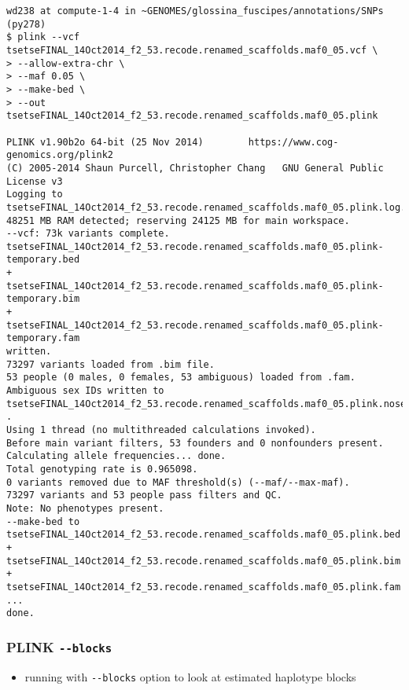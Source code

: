 \documentclass[letterpaper]{scrartcl}
\begin{document}
\begin{verbatim}
wd238 at compute-1-4 in ~GENOMES/glossina_fuscipes/annotations/SNPs (py278) 
$ plink --vcf tsetseFINAL_14Oct2014_f2_53.recode.renamed_scaffolds.maf0_05.vcf \
> --allow-extra-chr \
> --maf 0.05 \
> --make-bed \
> --out tsetseFINAL_14Oct2014_f2_53.recode.renamed_scaffolds.maf0_05.plink

PLINK v1.90b2o 64-bit (25 Nov 2014)        https://www.cog-genomics.org/plink2
(C) 2005-2014 Shaun Purcell, Christopher Chang   GNU General Public License v3
Logging to tsetseFINAL_14Oct2014_f2_53.recode.renamed_scaffolds.maf0_05.plink.log.
48251 MB RAM detected; reserving 24125 MB for main workspace.
--vcf: 73k variants complete.
tsetseFINAL_14Oct2014_f2_53.recode.renamed_scaffolds.maf0_05.plink-temporary.bed
+
tsetseFINAL_14Oct2014_f2_53.recode.renamed_scaffolds.maf0_05.plink-temporary.bim
+
tsetseFINAL_14Oct2014_f2_53.recode.renamed_scaffolds.maf0_05.plink-temporary.fam
written.
73297 variants loaded from .bim file.
53 people (0 males, 0 females, 53 ambiguous) loaded from .fam.
Ambiguous sex IDs written to
tsetseFINAL_14Oct2014_f2_53.recode.renamed_scaffolds.maf0_05.plink.nosex .
Using 1 thread (no multithreaded calculations invoked).
Before main variant filters, 53 founders and 0 nonfounders present.
Calculating allele frequencies... done.
Total genotyping rate is 0.965098.
0 variants removed due to MAF threshold(s) (--maf/--max-maf).
73297 variants and 53 people pass filters and QC.
Note: No phenotypes present.
--make-bed to
tsetseFINAL_14Oct2014_f2_53.recode.renamed_scaffolds.maf0_05.plink.bed +
tsetseFINAL_14Oct2014_f2_53.recode.renamed_scaffolds.maf0_05.plink.bim +
tsetseFINAL_14Oct2014_f2_53.recode.renamed_scaffolds.maf0_05.plink.fam ...
done.
\end{verbatim}

\subsubsection{PLINK \texttt{-\/-blocks}}\label{plink---blocks}

\begin{itemize}
\itemsep1pt\parskip0pt
\item
  running with \texttt{-\/-blocks} option to look at estimated haplotype
  blocks
\end{itemize}
\end{document}
